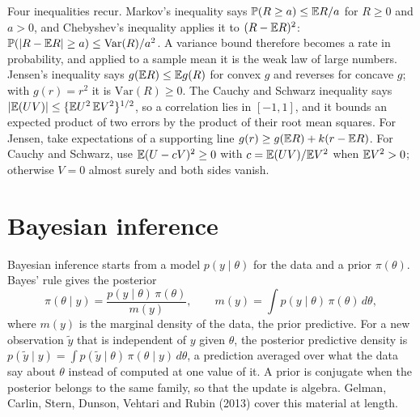 Four inequalities recur. Markov's inequality says $\mathbb{P}(R \ge a) \le \mathbb{E} R/a$ for $R \ge 0$ and $a > 0$, and Chebyshev's inequality applies it to $(R - \mathbb{E} R)^2$: $\mathbb{P}(|R - \mathbb{E} R| \ge a) \le \mathrm{Var}(R)/a^2$. A variance bound therefore becomes a rate in probability, and applied to a sample mean it is the weak law of large numbers. Jensen's inequality says $g(\mathbb{E} R) \le \mathbb{E} g(R)$ for convex $g$ and reverses for concave $g$; with $g(r) = r^2$ it is $\mathrm{Var}(R) \ge 0$. The Cauchy and Schwarz inequality says $|\mathbb{E}(UV)| \le \{\mathbb{E} U^2\,\mathbb{E} V^2\}^{1/2}$, so a correlation lies in $[-1, 1]$, and it bounds an expected product of two errors by the product of their root mean squares. For Jensen, take expectations of a supporting line $g(r) \ge g(\mathbb{E} R) + k(r - \mathbb{E} R)$. For Cauchy and Schwarz, use $\mathbb{E}(U - cV)^2 \ge 0$ with $c = \mathbb{E}(UV)/\mathbb{E} V^2$ when $\mathbb{E} V^2 > 0$; otherwise $V = 0$ almost surely and both sides vanish.

\section{Bayesian inference}\label{sec:bg:bayes}



Bayesian inference starts from a model $p(y \mid \theta)$ for the data and a prior $\pi(\theta)$. Bayes' rule gives the posterior
\[
\pi(\theta \mid y) = \frac{p(y \mid \theta)\,\pi(\theta)}{m(y)}, \qquad m(y) = \int p(y \mid \theta)\,\pi(\theta)\,d\theta,
\]
where $m(y)$ is the marginal density of the data, the prior predictive. For a new observation $\tilde y$ that is independent of $y$ given $\theta$, the posterior predictive density is $p(\tilde y \mid y) = \int p(\tilde y \mid \theta)\,\pi(\theta \mid y)\,d\theta$, a prediction averaged over what the data say about $\theta$ instead of computed at one value of it. A prior is conjugate when the posterior belongs to the same family, so that the update is algebra. Gelman, Carlin, Stern, Dunson, Vehtari and Rubin (2013) cover this material at length.

